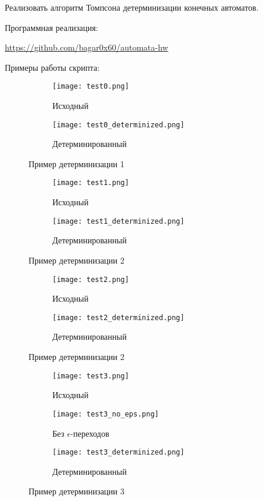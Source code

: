 \break

\begin{problem}
    Реализовать алгоритм Томпсона детерминизации конечных автоматов.
\end{problem}

Программная реализация:

\url{https://github.com/bagar0x60/automata-hw}
\break

Примеры работы скрипта:

\begin{figure}[h]
    \centering
    \begin{subfigure}[b]{0.6\linewidth}
      \texttt{[image: test0.png]}
      \caption{Исходный}
    \end{subfigure}
    \begin{subfigure}[b]{0.6\linewidth}
      \texttt{[image: test0\_determinized.png]}
      \caption{Детерминированный}
    \end{subfigure}
    \caption{Пример детерминизации 1}
\end{figure}

\begin{figure}[h]
    \centering
    \begin{subfigure}[b]{0.4\linewidth}
      \texttt{[image: test1.png]}
      \caption{Исходный}
    \end{subfigure}
    \begin{subfigure}[b]{0.4\linewidth}
      \texttt{[image: test1\_determinized.png]}
      \caption{Детерминированный}
    \end{subfigure}
    \caption{Пример детерминизации 2}
\end{figure}

\begin{figure}[h]
    \centering
    \begin{subfigure}[b]{0.3\linewidth}
      \texttt{[image: test2.png]}
      \caption{Исходный}
    \end{subfigure}
    \begin{subfigure}[b]{0.6\linewidth}
      \texttt{[image: test2\_determinized.png]}
      \caption{Детерминированный}
    \end{subfigure}
    \caption{Пример детерминизации 2}
\end{figure}

\begin{figure}[h]
    \centering
    \begin{subfigure}[b]{0.4\linewidth}
      \texttt{[image: test3.png]}
      \caption{Исходный}
    \end{subfigure}
    \begin{subfigure}[b]{0.4\linewidth}
        \texttt{[image: test3\_no\_eps.png]}
        \caption{Без $\epsilon$-переходов}
    \end{subfigure}
    \begin{subfigure}[b]{0.6\linewidth}
      \texttt{[image: test3\_determinized.png]}
      \caption{Детерминированный}
    \end{subfigure}
    \caption{Пример детерминизации 3}
\end{figure}